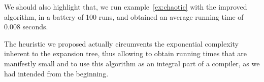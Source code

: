 
We should also highlight that, we run example~\eqref{ex:chaotic}
with the improved algorithm, in a battery of 100 runs, and obtained an
average running time of 0.008 seconds.

The heuristic we proposed actually circumvents the exponential complexity 
inherent to the expansion tree, thus allowing to obtain running times that 
are manifestly small and to use this algorithm as an integral 
part of a compiler, as we had intended from the beginning. 
%


